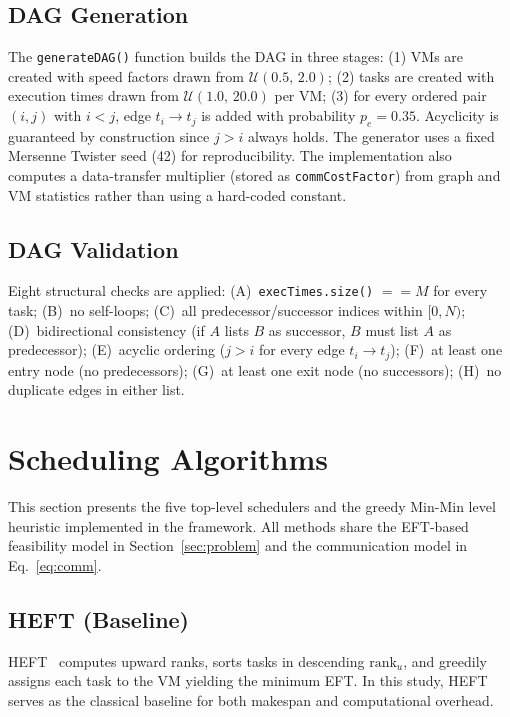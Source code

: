 \documentclass[conference]{IEEEtran}
\newcommand{\ranku}{\mathrm{rank}_u}
\begin{document}
\subsection{DAG Generation}

The \texttt{generateDAG()} function builds the DAG in three stages:
(1) VMs are created with speed factors drawn from
$\mathcal{U}(0.5,\,2.0)$; (2) tasks are created with execution times
drawn from $\mathcal{U}(1.0,\,20.0)$ per VM; (3) for every ordered
pair $(i,j)$ with $i < j$, edge $t_i \to t_j$ is added with
probability $p_e = 0.35$. Acyclicity is guaranteed by construction
since $j > i$ always holds. The generator uses a fixed Mersenne
Twister seed (42) for reproducibility. The implementation also
computes a data-transfer multiplier (stored as \texttt{commCostFactor})
from graph and VM statistics rather than using a hard-coded constant.

\subsection{DAG Validation}

Eight structural checks are applied:
(A)~\texttt{execTimes.size()} $== M$ for every task;
(B)~no self-loops;
(C)~all predecessor/successor indices within $[0,N)$;
(D)~bidirectional consistency (if $A$ lists $B$ as successor,
$B$ must list $A$ as predecessor);
(E)~acyclic ordering ($j > i$ for every edge $t_i \to t_j$);
(F)~at least one entry node (no predecessors);
(G)~at least one exit node (no successors);
(H)~no duplicate edges in either list.

\section{Scheduling Algorithms}
\label{sec:algorithms}

This section presents the five top-level schedulers and the greedy Min-Min
level heuristic implemented in the framework.
All methods share the EFT-based feasibility model in
Section~\ref{sec:problem} and the communication model in
Eq.~\eqref{eq:comm}.

\subsection{HEFT (Baseline)}

HEFT~\cite{topcuoglu2002heft} computes upward ranks, sorts tasks in
descending $\ranku$, and greedily assigns each task to the VM yielding
the minimum EFT. In this study, HEFT serves as the classical baseline
for both makespan and computational overhead.
\end{document}
